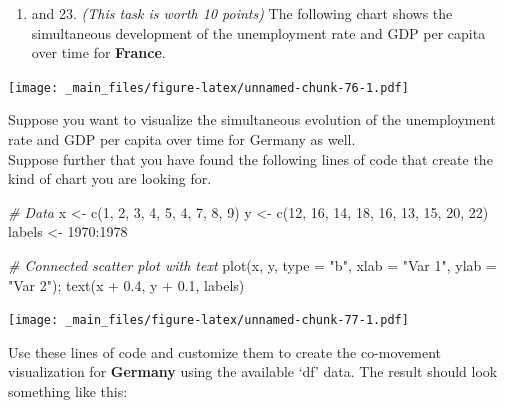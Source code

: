 \documentclass[
  12pt,
  oneside]{book}
\newenvironment{Shaded}{\begin{snugshade}}{\end{snugshade}}
\newcommand{\AttributeTok}[1]{\textcolor[rgb]{0.77,0.63,0.00}{#1}}
\newcommand{\CommentTok}[1]{\textcolor[rgb]{0.56,0.35,0.01}{\textit{#1}}}
\newcommand{\DecValTok}[1]{\textcolor[rgb]{0.00,0.00,0.81}{#1}}
\newcommand{\FloatTok}[1]{\textcolor[rgb]{0.00,0.00,0.81}{#1}}
\newcommand{\FunctionTok}[1]{\textcolor[rgb]{0.00,0.00,0.00}{#1}}
\newcommand{\NormalTok}[1]{#1}
\newcommand{\OtherTok}[1]{\textcolor[rgb]{0.56,0.35,0.01}{#1}}
\newcommand{\SpecialCharTok}[1]{\textcolor[rgb]{0.00,0.00,0.00}{#1}}
\newcommand{\StringTok}[1]{\textcolor[rgb]{0.31,0.60,0.02}{#1}}
\providecommand{\tightlist}{%
  \setlength{\itemsep}{0pt}\setlength{\parskip}{0pt}}
\theoremstyle{definition}
\theoremstyle{definition}
\theoremstyle{definition}
\theoremstyle{definition}
\theoremstyle{remark}
\begin{document}
\begin{enumerate}
\def\labelenumi{(\arabic{enumi})}
\setcounter{enumi}{21}
\tightlist
\item
  and 23. \emph{(This task is worth 10 points)}
  The following chart shows the simultaneous development of the unemployment rate and GDP per capita over time for \textbf{France}.
\end{enumerate}

\texttt{[image: \_main\_files/figure-latex/unnamed-chunk-76-1.pdf]}

Suppose you want to visualize the simultaneous evolution of the unemployment rate and GDP per capita over time for Germany as well.\\
Suppose further that you have found the following lines of code that create the kind of chart you are looking for.

\begin{Shaded}
\begin{Highlighting}[]
\CommentTok{\# Data}
\NormalTok{x }\OtherTok{\textless{}{-}} \FunctionTok{c}\NormalTok{(}\DecValTok{1}\NormalTok{, }\DecValTok{2}\NormalTok{, }\DecValTok{3}\NormalTok{, }\DecValTok{4}\NormalTok{, }\DecValTok{5}\NormalTok{, }\DecValTok{4}\NormalTok{, }\DecValTok{7}\NormalTok{, }\DecValTok{8}\NormalTok{, }\DecValTok{9}\NormalTok{)}
\NormalTok{y }\OtherTok{\textless{}{-}} \FunctionTok{c}\NormalTok{(}\DecValTok{12}\NormalTok{, }\DecValTok{16}\NormalTok{, }\DecValTok{14}\NormalTok{, }\DecValTok{18}\NormalTok{, }\DecValTok{16}\NormalTok{, }\DecValTok{13}\NormalTok{, }\DecValTok{15}\NormalTok{, }\DecValTok{20}\NormalTok{, }\DecValTok{22}\NormalTok{)}
\NormalTok{labels }\OtherTok{\textless{}{-}} \DecValTok{1970}\SpecialCharTok{:}\DecValTok{1978}

\CommentTok{\# Connected scatter plot with text}
\FunctionTok{plot}\NormalTok{(x, y, }\AttributeTok{type =} \StringTok{"b"}\NormalTok{, }\AttributeTok{xlab =} \StringTok{"Var 1"}\NormalTok{, }\AttributeTok{ylab =} \StringTok{"Var 2"}\NormalTok{); }\FunctionTok{text}\NormalTok{(x }\SpecialCharTok{+} \FloatTok{0.4}\NormalTok{, y }\SpecialCharTok{+} \FloatTok{0.1}\NormalTok{, labels) }
\end{Highlighting}
\end{Shaded}

\texttt{[image: \_main\_files/figure-latex/unnamed-chunk-77-1.pdf]}

Use these lines of code and customize them to create the co-movement visualization for \textbf{Germany} using the available `df' data.
The result should look something like this:
\end{document}
